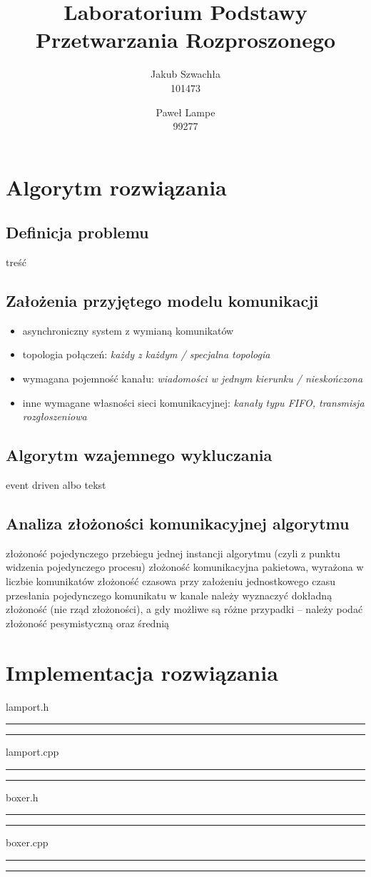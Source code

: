 \documentclass{article}
\title{\textbf{Laboratorium Podstawy Przetwarzania Rozproszonego}}
\author{Jakub Szwachła \\ 101473 \and  Paweł Lampe \\ 99277}
\begin{document}
\maketitle

\section{Algorytm rozwiązania}
\subsection{Definicja problemu}
treść

\subsection{Założenia przyjętego modelu komunikacji}
\begin{itemize}
\item asynchroniczny system z wymianą komunikatów
\item topologia połączeń: \emph{każdy z każdym / specjalna topologia}
\item wymagana pojemność kanału:  \emph{wiadomości w jednym kierunku / nieskończona}
\item inne wymagane własności sieci komunikacyjnej: \emph{kanały typu FIFO, transmisja rozgłoszeniowa}
\end{itemize}

\subsection{Algorytm wzajemnego wykluczania}
event driven albo tekst

\subsection{Analiza złożoności komunikacyjnej algorytmu}
złożoność pojedynczego przebiegu jednej instancji algorytmu (czyli z punktu widzenia pojedynczego procesu) 
złożoność komunikacyjna pakietowa, wyrażona w liczbie komunikatów
złożoność czasowa przy założeniu jednostkowego czasu przesłania pojedynczego komunikatu w kanale
należy wyznaczyć dokładną złożoność (nie rząd złożoności), a gdy możliwe są różne przypadki – należy podać złożoność pesymistyczną oraz średnią

\section{Implementacja rozwiązania}
lamport.h
\hrule

\hrule
lamport.cpp
\hrule

\hrule
boxer.h
\hrule

\hrule
boxer.cpp
\hrule

\hrule
\end{document}
